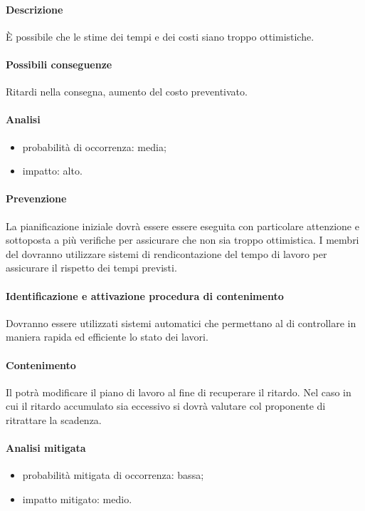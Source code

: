			\paragraph{Descrizione} È possibile che le stime dei tempi e dei costi siano troppo ottimistiche.
			\paragraph{Possibili conseguenze} Ritardi nella consegna, aumento del costo preventivato.
			\paragraph{Analisi}
			\begin{itemize}
			\item{probabilità di occorrenza:} media;
			\item{impatto:} alto.
			\end{itemize}
			\paragraph{Prevenzione} La pianificazione iniziale dovrà essere essere eseguita con particolare attenzione e sottoposta a più verifiche per assicurare che non sia troppo ottimistica. I membri del  dovranno utilizzare sistemi di rendicontazione del tempo di lavoro per assicurare il rispetto dei tempi previsti.
			\paragraph{Identificazione e attivazione procedura di contenimento} Dovranno essere utilizzati sistemi automatici che permettano al \responsabilediprogetto{} di controllare in maniera rapida ed efficiente lo stato dei lavori.
			\paragraph{Contenimento} Il \responsabilediprogetto{} potrà modificare il piano di lavoro al fine di recuperare il ritardo. Nel caso in cui il ritardo accumulato sia eccessivo si dovrà valutare col proponente di ritrattare la scadenza.
			\paragraph{Analisi mitigata}
			\begin{itemize}
			\item{probabilità mitigata di occorrenza:} bassa;
			\item{impatto mitigato:} medio.
			\end{itemize}
